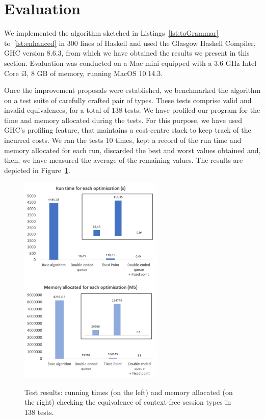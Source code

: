 \section{Evaluation}
\label{sec:evaluation}


We implemented the algorithm sketched in Listings~\ref{lst:toGrammar}
to~\ref{lst:enhanced} in 300 lines of Haskell and used the Glasgow
Haskell Compiler, GHC version 8.6.3, from which we have obtained the
results we present in this section.  Evaluation was conducted on a Mac
mini equipped with a 3.6 GHz Intel Core i3, 8 GB of memory, running
MacOS 10.14.3.

Once the improvement proposals were established, we benchmarked the
algorithm on a test suite of carefully crafted pair of types. These
tests comprise valid and invalid equivalences, for a total of 138
tests. We have profiled our program for the time and memory allocated
during the tests. For this purpose, we have used GHC's profiling
feature, that maintains a cost-centre stack to keep track of the
incurred costs. We ran the tests 10 times, kept a record of the run
time and memory allocated for each run, discarded the best and worst
values obtained and, then, we have measured the average of the
remaining values. The results are depicted in
Figure~\ref{fig:results}.

\begin{figure}[h]
	\includegraphics[height=5cm]{img/run_time}	\enspace
	\includegraphics[height=5cm]{img/memory_alloc}
	\caption{Test results: running times (on the left) and
	memory allocated (on the right) checking the equivalence
	of context-free session types in 138 tests.}
	\label{fig:results}
\end{figure}


